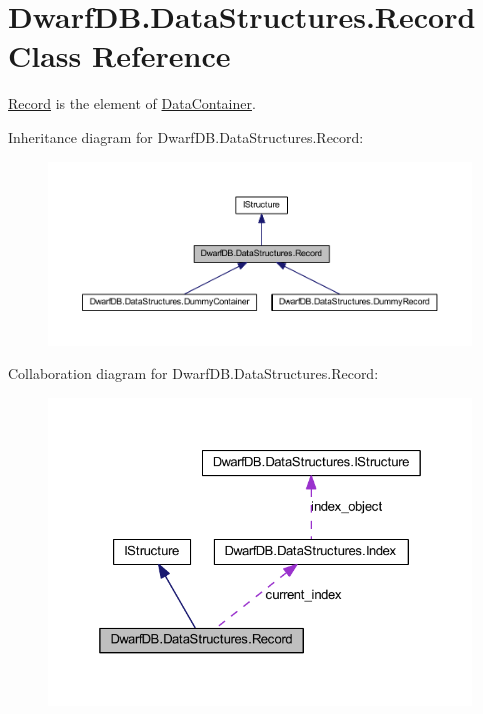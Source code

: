 \hypertarget{class_dwarf_d_b_1_1_data_structures_1_1_record}{
\section{DwarfDB.DataStructures.Record Class Reference}
\label{class_dwarf_d_b_1_1_data_structures_1_1_record}
}


\hyperlink{class_dwarf_d_b_1_1_data_structures_1_1_record}{Record} is the element of \hyperlink{class_dwarf_d_b_1_1_data_structures_1_1_data_container}{DataContainer}.  




Inheritance diagram for DwarfDB.DataStructures.Record:\nopagebreak
\begin{figure}[H]
\begin{center}
\leavevmode
\includegraphics[width=400pt]{class_dwarf_d_b_1_1_data_structures_1_1_record__inherit__graph}
\end{center}
\end{figure}


Collaboration diagram for DwarfDB.DataStructures.Record:\nopagebreak
\begin{figure}[H]
\begin{center}
\leavevmode
\includegraphics[width=325pt]{class_dwarf_d_b_1_1_data_structures_1_1_record__coll__graph}
\end{center}
\end{figure}
